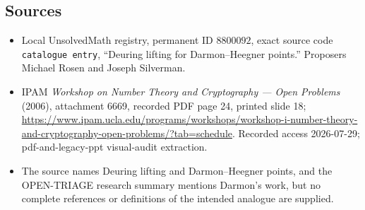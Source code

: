 \documentclass[11pt]{article}
\begin{document}
\subsection{Sources}
\begin{itemize}
\item Local UnsolvedMath registry, permanent ID \(8800092\), exact source code \texttt{catalogue entry}, ``Deuring lifting for Darmon--Heegner points.'' Proposers Michael Rosen and Joseph Silverman.
\item IPAM \emph{Workshop on Number Theory and Cryptography --- Open Problems} (2006), attachment 6669, recorded PDF page 24, printed slide 18; \url{https://www.ipam.ucla.edu/programs/workshops/workshop-i-number-theory-and-cryptography-open-problems/?tab=schedule}. Recorded access 2026-07-29; pdf-and-legacy-ppt visual-audit extraction.
\item The source names Deuring lifting and Darmon--Heegner points, and the OPEN-TRIAGE research summary mentions Darmon's work, but no complete references or definitions of the intended analogue are supplied.
\end{itemize}
\end{document}
